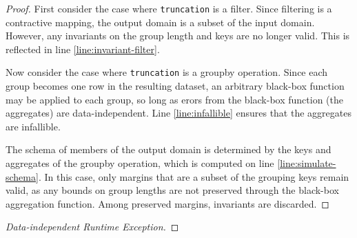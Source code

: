 \documentclass{article}
\begin{document}
\begin{proof}
    First consider the case where \texttt{truncation} is a filter.
    Since filtering is a contractive mapping,
    the output domain is a subset of the input domain. 
    However, any invariants on the group length and keys are no longer valid. 
    This is reflected in line \ref{line:invariant-filter}.

    Now consider the case where \texttt{truncation} is a groupby operation.
    Since each group becomes one row in the resulting dataset, 
    an arbitrary black-box function may be applied to each group, 
    so long as erors from the black-box function (the aggregates) are data-independent.
    Line \ref{line:infallible} ensures that the aggregates are infallible.

    The schema of members of the output domain is determined by the keys and aggregates of the groupby operation,
    which is computed on line \ref{line:simulate-schema}.
    In this case, only margins that are a subset of the grouping keys remain valid,
    as any bounds on group lengths are not preserved through the black-box aggregation function.
    Among preserved margins, invariants are discarded.
\end{proof}

\begin{proof}[Data-independent Runtime Exception]
    
\end{proof}
\end{document}
